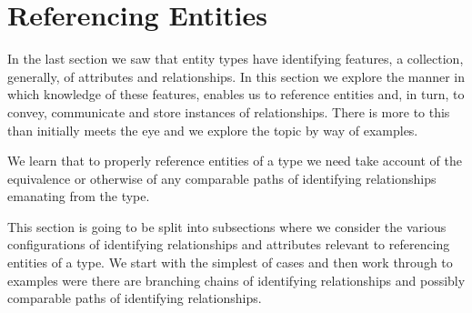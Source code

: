 \section{Referencing Entities}
\label{ReferencingEntities}

In the last section we saw that entity types have identifying features, a collection, generally, of attributes and relationships.
In this section we explore  the manner in which knowledge of these features, enables us to 
reference entities and, in turn, 
to convey, communicate and store instances of relationships. 
There is more to this than initially meets the eye and we explore the topic
by way of examples.   
\begin{newtt}
We learn that to properly reference entities of a type we need take account of the equivalence or otherwise of any comparable paths of
identifying relationships emanating from the type.
\end{newtt}

This section is going to be split into subsections where we consider the various configurations of identifying relationships and attributes 
relevant to referencing entities of a type. We start with the simplest of cases and then work through to examples were there are branching chains of identifying relationships and possibly comparable paths of identifying relationships. 

